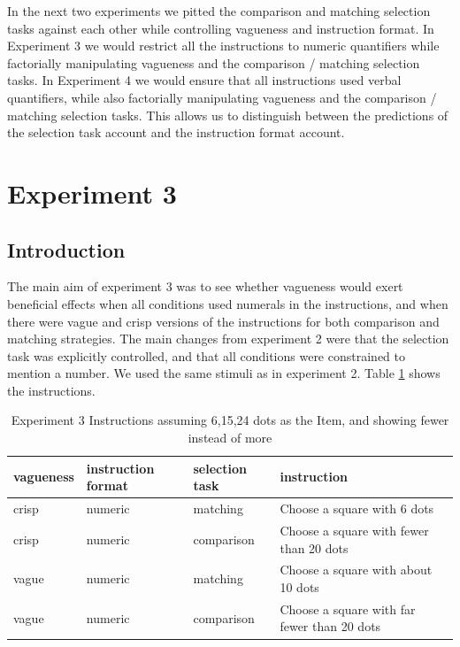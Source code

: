 \documentclass[
a4paper 
, doc
, longtable
]{apa6}
\begin{document}
In the next two experiments we pitted the comparison and matching selection tasks against each other while controlling vagueness and instruction format. In Experiment 3 we would restrict all the instructions to numeric quantifiers while factorially manipulating vagueness and the comparison / matching selection tasks. In Experiment 4 we would ensure that all instructions used verbal quantifiers, while also factorially manipulating vagueness and the comparison / matching selection tasks. This allows us to distinguish between the predictions of the selection task account and the instruction format account. 

\section{Experiment 3}

\subsection{Introduction}

The main aim of experiment 3 was to see whether vagueness would exert beneficial effects when all conditions used numerals in the instructions, and when there were vague and crisp versions of the instructions for both comparison and matching strategies. The main changes from experiment 2 were that the selection task was explicitly controlled, and that all conditions were constrained to mention a number. We used the same stimuli as in experiment 2. Table \ref{instructionse3} shows the instructions. %

\begin{table}[htbp]
\begin{center}
\caption{Experiment 3 Instructions assuming 6,15,24 dots as the Item, and showing fewer instead of more}
\label{instructionse3}
\begin{tabular}{llll}
\toprule
vagueness&instruction format&selection task&instruction\\
\midrule
crisp & numeric&matching & Choose a square with 6 dots \\ 
crisp & numeric&comparison & Choose a square with fewer than 20 dots \\
vague & numeric&matching & Choose a square with about 10 dots \\ 
vague & numeric&comparison & Choose a square with far fewer than 20 dots \\ 
\bottomrule
\end{tabular}
\end{center}
\end{table}
\end{document}
